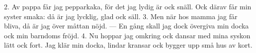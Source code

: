 2.  Av pappa får jag pepparkaka,
    för det jag lydig är ock snäll.
    Ock därav får min syster smaka:
    då är jag lycklig, glad ock säll.
3.  Men när hos mamma jag får bliva,
    då är jag över måttan nöjd. —
    En gång skall jag dock övergiva
    min docka ock min barndoms fröjd.
4.  Nu hoppar jag omkring ock dansar
    med mina syskon lätt ock fort.
    Jag klär min docka, lindar kransar
    ock bygger upp små hus av kort.
